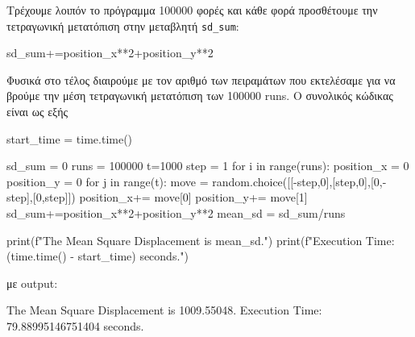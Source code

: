 Τρέχουμε λοιπόν το πρόγραμμα 100000 φορές και κάθε φορά προσθέτουμε την τετραγωνική μετατόπιση στην μεταβλητή  {\en \texttt{sd\_sum}}:
\en 
\begin{python}
sd_sum+=position_x**2+position_y**2
\end{python}
\gr
Φυσικά στο τέλος διαιρούμε με τον αριθμό των πειραμάτων που εκτελέσαμε για να βρούμε την μέση τετραγωνική μετατόπιση των 100000 {\en runs}. Ο συνολικός κώδικας είναι ως εξής \en
\begin{python}
start_time = time.time()

sd_sum = 0
runs = 100000
t=1000
step = 1
for i in range(runs):
    position_x = 0
    position_y = 0
    for j in range(t):
        move = random.choice([[-step,0],[step,0],[0,-step],[0,step]])
        position_x+= move[0]
        position_y+= move[1]
    sd_sum+=position_x**2+position_y**2
mean_sd = sd_sum/runs

print(f"The Mean Square Displacement is {mean_sd}.")
print(f"Execution Time: {(time.time() - start_time)} seconds.")
\end{python}
\gr 
με \en output:
\begin{python}
The Mean Square Displacement is 1009.55048.
Execution Time: 79.88995146751404 seconds.
\end{python}
\gr    